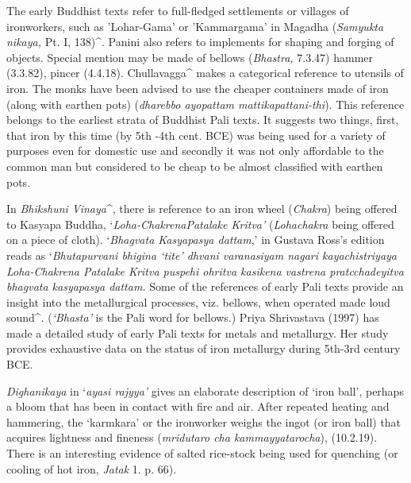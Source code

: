 The early Buddhist texts refer to full-fledged settlements or villages of ironworkers, such as 'Lohar-Gama' or 'Kammargama' in Magadha (\textit{Samyukta nikaya,} Pt. I, 138)^. Panini also refers to implements for shaping and forging of objects. Special mention may be made of bellows (\textit{Bhastra, }7.3.47) hammer (3.3.82), pincer (4.4.18). Chullavagga^ makes a categorical reference to utensils of iron. The monks have been advised to use the cheaper containers made of iron (along with earthen pots) (\textit{dharebbo ayopattam mattikapattani-thi}). This reference belongs to the earliest strata of Buddhist Pali texts. It suggests two things, first, that iron by this time (by 5th -4th cent. BCE) was being used for a variety of purposes even for domestic use and secondly it was not only affordable to the common man but considered to be cheap to be almost classified with earthen pots.

In \textit{Bhikshuni Vinaya}^, there is reference to an iron wheel (\textit{Chakra}) being offered to Kasyapa Buddha, ‘\textit{Loha-Chakrena}\textit{Patalake Kritva’} (\textit{Lohachakra} being offered on a piece of cloth). ‘\textit{Bhagvata Kasyapasya dattam},’ in Gustava Ross’s edition reads as ‘\textit{Bhutapurvani bhigina ‘tite’ dhvani varanasiyam nagari kayachistriyaya Loha-Chakrena Patalake Kritva puspehi ohritva kasikena vastrena pratcchadeyitva bhagvata kasyapasya dattam.} Some of the references of early Pali texts provide an insight into the metallurgical processes, viz. bellows, when operated made loud sound^. (\textit{‘Bhasta’} is the Pali word for bellows.) Priya Shrivastava (1997) has made a detailed study of early Pali texts for metals and metallurgy. Her study provides exhaustive data on the status of iron metallurgy during 5th-3rd century BCE.

\textit{Dighanikaya} in ‘\textit{ayasi rajyya’} gives an elaborate description of ‘iron ball’, perhaps a bloom that has been in contact with fire and air. After repeated heating and hammering, the ‘karmkara’ or the ironworker weighs the ingot (or iron ball) that acquires lightness and fineness (\textit{mridutaro cha kammayyatarocha}), (10.2.19). There is an interesting evidence of salted rice-stock being used for quenching (or cooling of hot iron, \textit{Jatak} 1. p. 66).


